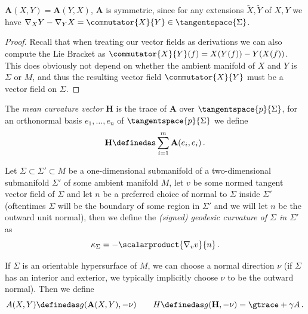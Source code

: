\documentclass[titlepage,numbers=noenddot,oneside,%
cleardoublepage=empty,paper=a4,fontsize=11pt,%
english,%
]{scrartcl}
\newcommand*{\mathfullstop}{\,.}
\begin{document}
{\begin{fact}
    \( \mathbf{A}(X,Y)=\mathbf{A}(Y,X) \), \ie \( \mathbf{A} \) is symmetric, since for any extensions \( \tilde{X},\tilde{Y} \) of \( X,Y \) we have \( \Mconnection_X Y-\Mconnection_Y X=\commutator{X}{Y}\in \tangentspace{\Sigma} \).
\end{fact}
\begin{proof}
    Recall that when treating our vector fields as derivations we can also compute the Lie Bracket  as \( \commutator{X}{Y}(f)=X(Y(f))-Y(X(f)) \). This does obviously not depend on whether the ambient manifold of \( X \) and \( Y \) is \( \Sigma \) or \( M \), and thus the resulting vector field \( \commutator{X}{Y} \) must be a vector field on \( \Sigma \). 
\end{proof}
\begin{definition}
    The \emph{mean curvature vector} \( \mathbf{H} \) is the trace of \( \mathbf{A} \) over \( \tangentspace{p}{\Sigma} \), \ie for an orthonormal basis \( e_1,\dotsc,e_n \) of \( \tangentspace{p}{\Sigma} \) we define
    \begin{equation*}
        \mathbf{H}\definedas \sum_{i=1}^{m}\mathbf{A}(e_i,e_i)\mathfullstop
    \end{equation*}
\end{definition}
\begin{definition}\label{def:geodesic_curvature}
    Let \( \Sigma\subset \Sigma'\subset M \) be a one-dimensional submanifold of a two-dimensional submanifold \( \Sigma' \) of some ambient manifold \( M \), let \( v \) be some normed tangent vector field of \( \Sigma \) and let \( n \) be a preferred choice of normal to \( \Sigma \) inside \( \Sigma' \) (oftentimes \( \Sigma \) will be the boundary of some region in \( \Sigma' \) and we will let \( n \) be the outward unit normal), then we define the \emph{(signed) geodesic curvature of \( \Sigma \) in \( \Sigma' \)} as
    \begin{equation}\label{eq:def_geodesic_curvature}
        \kappa_{\Sigma}=-\scalarproduct{\nabla_v v}{n}\mathfullstop
    \end{equation}
\end{definition}
\begin{definition}
    If \( \Sigma \) is an orientable hypersurface of \( M \), we can choose a normal direction \( \nu \) (if \( \Sigma \) has an interior and exterior, we typically implicitly choose \( \nu \) to be the outward normal). Then we define
    \begin{equation}
        A(X,Y)\definedas g(\mathbf{A}(X,Y),-\nu)\qquad H\definedas g(\mathbf{H},-\nu)=\gtrace+{\gamma}{A}\mathfullstop\label{eq:def_mean_curvature}

\end{equation}
\end{definition}}
\end{document}
